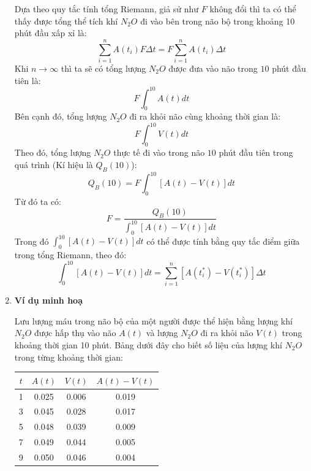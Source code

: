 \documentclass[12pt,a4paper]{article}
\begin{document}
\begin{enumerate}[a/]
\begin{center}
	      \end{center}
	      \begin{flushleft}
		      Dựa theo quy tắc tính tổng Riemann, giả sử như $F$ không đổi thì ta có thể thấy được tổng thể tích khí $N_2O$ đi vào bên trong não bộ trong khoảng 10 phút đầu xấp xỉ là:
		      $$\sum_{i = 1}^{n} A(t_i)F\Delta t = F \sum_{i = 1}^{n} A(t_i) \Delta t$$
		      Khi $n \to \infty$ thì ta sẽ có tổng lượng $N_2O$ được đưa vào não trong $10$ phút đầu tiên là:
		      $$F \int_{0}^{10} A(t)dt$$
		      Bên cạnh đó, tổng lượng $N_2O$ đi ra khỏi não cùng khoảng thời gian là:
		      $$F \int_{0}^{10} V(t)dt$$
		      Theo đó, tổng lượng $N_2O$ thực tế đi vào trong não $10$ phút đầu tiên trong quá trình (Kí hiệu là $Q_B(10)$):
		      $$Q_B(10)=F\int_{0}^{10}\left[A(t)-V(t)\right]dt$$
		      Từ đó ta có:
		      $$F=\frac{Q_B(10)}{\displaystyle \int_{0}^{10}\left[A(t) - V(t)\right]dt}$$
		      Trong đó $\displaystyle \int_{0}^{10}\left[A(t) - V(t)\right]dt$ có thể được tính bằng quy tắc điểm giữa trong tổng Riemann, theo đó:
		      $$\displaystyle \int_{0}^{10}\left[A(t) - V(t)\right]dt = \sum_{i = 1}^{n} \left[A(t_i^*)-V(t_i^*)\right] \Delta t$$
	      \end{flushleft}
	\item \textbf{Ví dụ minh hoạ}
	      \begin{flushleft}
		      Lưu lượng máu trong não bộ của một người được thể hiện bằng lượng khí $N_2O$ được hấp thụ vào não $A(t)$ và lượng $N_2O$ đi ra khỏi não $V(t)$ trong khoảng thời gian 10 phút.
		      Bảng dưới đây cho biết số liệu của lượng khí $N_2O$ trong từng khoảng thời gian:
	      \end{flushleft}
	      \begin{table}[H]
		      \centering
		      \def\arraystretch{1.2}
		      \begin{tabular}{|c|c|c|c|}
			      \hline
			      $t$ & $A(t)$ & $V(t)$ & $A(t) - V(t)$ \\
			      \hline
			      1   & 0.025  & 0.006  & 0.019         \\
			      \hline
			      3   & 0.045  & 0.028  & 0.017         \\
			      \hline
			      5   & 0.048  & 0.039  & 0.009         \\
			      \hline
			      7   & 0.049  & 0.044  & 0.005         \\
			      \hline
			      9   & 0.050  & 0.046  & 0.004         \\
			      \hline
		      \end{tabular}

\end{table}
\end{enumerate}
\end{document}

